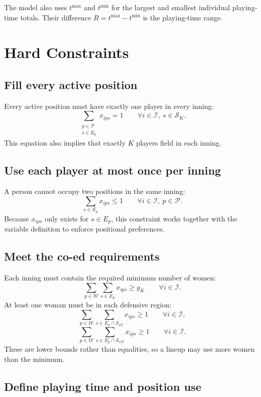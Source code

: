 \documentclass[11pt]{article}
\begin{document}
The model also uses $t^{\max}$ and $t^{\min}$ for the largest and smallest
individual playing-time totals. Their difference $R=t^{\max}-t^{\min}$ is the
playing-time range.

\section{Hard Constraints}

\subsection{Fill every active position}

Every active position must have exactly one player in every inning:
\[
\sum_{\substack{p\in\mathcal{P}\\s\in E_p}}x_{ips}=1
\qquad
\forall i\in\mathcal{I},\ s\in\mathcal{S}_K.
\]
This equation also implies that exactly $K$ players field in each inning.

\subsection{Use each player at most once per inning}

A person cannot occupy two positions in the same inning:
\[
\sum_{s\in E_p}x_{ips}\leq1
\qquad
\forall i\in\mathcal{I},\ p\in\mathcal{P}.
\]
Because $x_{ips}$ only exists for $s\in E_p$, this constraint works together
with the variable definition to enforce positional preferences.

\subsection{Meet the co-ed requirements}

Each inning must contain the required minimum number of women:
\[
\sum_{p\in\mathcal{W}}\sum_{s\in E_p}x_{ips}\geq g_K
\qquad \forall i\in\mathcal{I}.
\]
At least one woman must be in each defensive region:
\[
\sum_{p\in\mathcal{W}}
\sum_{s\in E_p\cap\mathcal{S}_{IF}}x_{ips}\geq1
\qquad \forall i\in\mathcal{I},
\]
\[
\sum_{p\in\mathcal{W}}
\sum_{s\in E_p\cap\mathcal{S}_{OF}}x_{ips}\geq1
\qquad \forall i\in\mathcal{I}.
\]
These are lower bounds rather than equalities, so a lineup may use more women
than the minimum.

\subsection{Define playing time and position use}
\end{document}
